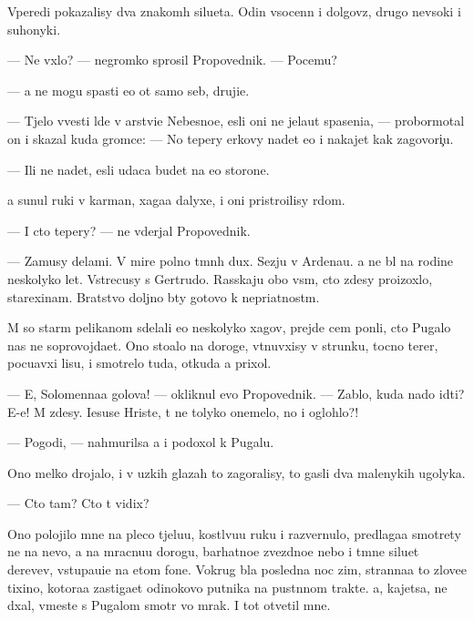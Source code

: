 \documentclass[10pt]{book}
\begin{document}
Vperedi pokazalisy dva znakom{\yi}h silueta. Odin v{\yi}socenn{\yi}{\y} i dolgov{\ia}z{\yi}{\y}, drugo{\y} nev{\yi}soki{\y} i suhonyki{\y}.

— Ne v{\yi}xlo? — negromko sprosil Propovednik. — Pocemu?

— {\Y}a ne mogu spasti {\y}e{\y}o ot samo{\y} seb{\ia}, druji{\x}e.

— T{\ia}jelo vvesti l{\iu}de{\y} v {\C}arstvi{\y}e Nebesno{\y}e, {\y}esli oni ne jela{\y}ut spaseni{\y}a, — probormotal on i skazal kuda gromce: — No tepery {\C}erkovy na{\y}det {\y}e{\y}o i nakajet kak zagovor{\x}i{\c}u.

— Ili ne na{\y}det, {\y}esli udaca budet na {\y}e{\y}o storone.

{\Y}a sunul ruki v karman{\yi}, xaga{\y}a dalyxe, i oni pristro{\y}ilisy r{\ia}dom.

— I cto tepery? — ne v{\yi}derjal Propovednik.

— Za{\y}musy delami. V mire polno t{\e}mn{\yi}h dux. S{\y}ezju v Ardenau. {\Y}a ne b{\yi}l na rodine neskolyko let. Vstrecusy s Gertrudo{\y}. Rasskaju obo vs{\e}m, cto zdesy proizoxlo, stare{\y}xinam. Bratstvo doljno b{\yi}ty gotovo k nepri{\y}atnost{\ia}m.

M{\yi} so star{\yi}m pelikanom sdelali {\y}e{\x}o neskolyko xagov, prejde cem pon{\ia}li, cto Pugalo nas ne soprovojda{\y}et. Ono sto{\y}alo na doroge, v{\yi}t{\ia}nuvxisy v strunku, tocno ter{\y}er, pocu{\y}avxi{\y} lisu, i smotrelo tuda, otkuda {\y}a prixol.

— E{\y}, Solomenna{\y}a golova! — okliknul {\y}evo Propovednik. — Zab{\yi}lo, kuda nado idti? E-e{\y}! M{\yi} zdesy. Iesuse Hriste, t{\yi} ne tolyko onemelo, no i oglohlo?!

— Pogodi, — nahmurilsa {\y}a i podoxol k Pugalu.

Ono melko drojalo, i v uzkih glazah to zagoralisy, to gasli dva malenykih ugolyka.

— Cto tam? Cto t{\yi} vidix?

Ono polojilo mne na pleco t{\ia}jelu{\y}u, kostl{\ia}vu{\y}u ruku i razvernulo, predlaga{\y}a smotrety ne na nevo, a na mracnu{\y}u dorogu, barhatno{\y}e zvezdno{\y}e nebo i t{\e}mn{\yi}{\y}e siluet{\yi} derev{\y}ev, v{\yi}stupa{\y}u{\x}i{\y}e na etom fone. Vokrug b{\yi}la posledn{\ia}{\y}a noc zim{\yi}, stranna{\y}a to{\y} zlove{\x}e{\y} tixino{\y}, kotora{\y}a zastiga{\y}et odinokovo putnika na pust{\yi}nnom trakte. {\Y}a, kajetsa, ne d{\yi}xal, vmeste s Pugalom smotr{\ia} vo mrak. I tot otvetil mne.
\end{document}
